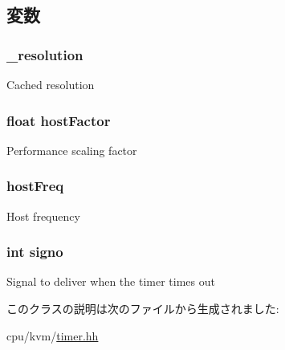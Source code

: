 \subsection{変数}
\hypertarget{classBaseKvmTimer_ad8d1a189e5fdd7cf11ab8165cf05a88c}{
\subsubsection[{\_\-resolution}]{ {\bf \_\-resolution}}}
\label{classBaseKvmTimer_ad8d1a189e5fdd7cf11ab8165cf05a88c}
Cached resolution \hypertarget{classBaseKvmTimer_a0ef366aa4bbbcdc2f7eeb7fcd3962dde}{
\subsubsection[{hostFactor}]{\setlength{\rightskip}{0pt plus 5cm}float {\bf hostFactor}}}
\label{classBaseKvmTimer_a0ef366aa4bbbcdc2f7eeb7fcd3962dde}
Performance scaling factor \hypertarget{classBaseKvmTimer_af880b55be2bf83ac65eb9b0abe62ae49}{
\subsubsection[{hostFreq}]{ {\bf hostFreq}}}
\label{classBaseKvmTimer_af880b55be2bf83ac65eb9b0abe62ae49}
Host frequency \hypertarget{classBaseKvmTimer_a68acd751895efa9ac5a6461017f1d2d8}{
\subsubsection[{signo}]{\setlength{\rightskip}{0pt plus 5cm}int {\bf signo}}}
\label{classBaseKvmTimer_a68acd751895efa9ac5a6461017f1d2d8}
Signal to deliver when the timer times out 

このクラスの説明は次のファイルから生成されました:\begin{DoxyCompactItemize}
\item 
cpu/kvm/\hyperlink{timer_8hh}{timer.hh}\end{DoxyCompactItemize}

